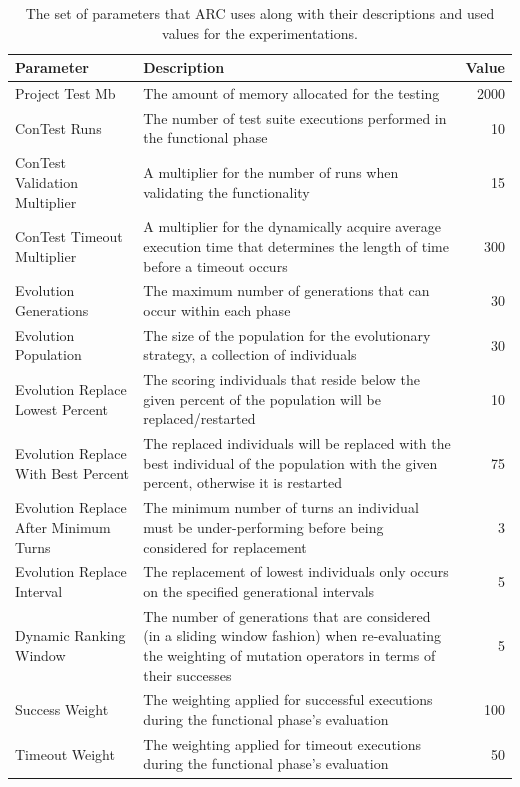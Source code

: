 \documentclass{llncs}
\begin{document}
\begin{table}[!t]
\caption{The set of parameters that ARC uses along with their descriptions and
used values for the experimentations.}
\begin{center}
\begin{tabular}{|p{3cm}|p{10cm}|r|}
\hline
\textbf{Parameter} & \textbf{Description} & \textbf{Value}\\
\hline
Project Test Mb & The amount of memory allocated for the testing & 2000\\
\hline
ConTest Runs & The number of test suite executions performed in the functional phase & 10\\
\hline
ConTest Validation Multiplier & A multiplier for the number of runs when validating the functionality & 15\\
\hline
ConTest Timeout Multiplier & A multiplier for the dynamically acquire average execution time that determines the length of time before a timeout occurs & 300\\
\hline
Evolution Generations & The maximum number of generations that can occur within each phase & 30\\
\hline
Evolution Population & The size of the population for the evolutionary strategy, a collection of individuals & 30\\
\hline
Evolution Replace Lowest Percent & The scoring individuals that reside below the given percent of the population will be replaced/restarted & 10\\
\hline
Evolution Replace With Best Percent & The replaced individuals will be replaced with the best individual of the population with the given percent, otherwise it is restarted & 75\\
\hline
Evolution Replace After Minimum Turns & The minimum number of turns an individual must be under-performing before being considered for replacement & 3\\
\hline
Evolution Replace Interval & The replacement of lowest individuals only occurs on the specified generational intervals & 5\\
\hline
Dynamic Ranking Window & The number of generations that are considered (in a sliding window fashion) when re-evaluating the weighting of mutation operators in terms of their successes & 5\\
\hline
Success Weight & The weighting applied for successful executions during the functional phase's evaluation & 100\\
\hline
Timeout Weight & The weighting applied for timeout executions during the functional phase's evaluation & 50\\

\end{tabular}
\end{center}
\end{table}
\end{document}

